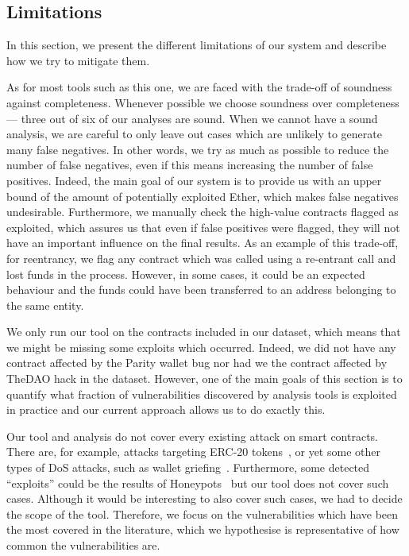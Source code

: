 \subsection{Limitations}
\label{sec:5a:limitations}
In this section, we present the different limitations of our system and describe how we try to mitigate them.

 As for most tools such as this one, we are faced with the trade-off of soundness against completeness. Whenever possible we choose soundness over completeness --- three out of six of our analyses are sound. When we cannot have a sound analysis, we are careful to only leave out cases which are unlikely to generate many false negatives. In other words, we try as much as possible to reduce the number of false negatives, even if this means increasing the number of false positives.
Indeed, the main goal of our system is to provide us with an upper bound of the amount of potentially exploited Ether, which makes false negatives undesirable.
Furthermore, we manually check the high-value contracts flagged as exploited, which assures us that even if false positives were flagged, they will not have an important influence on the final results.
As an example of this trade-off, for reentrancy, we flag any contract which was called using a re-entrant call and lost funds in the process. However, in some cases, it could be an expected behaviour and the funds could have been transferred to an address belonging to the same entity.

 We only run our tool on the contracts included in our dataset, which means that we might be missing some exploits which occurred. Indeed, we did not have any contract affected by the Parity wallet bug nor had we the contract affected by TheDAO hack in the dataset.
However, one of the main goals of this section is to quantify what fraction of vulnerabilities discovered by analysis tools is exploited in practice and our current approach allows us to do exactly this.

 Our tool and analysis do not cover every existing attack on smart contracts. There are, for example, attacks targeting ERC-20 tokens~\cite{8802438}, or yet some other types of DoS attacks, such as wallet griefing~\cite{Grech2018}.
Furthermore, some detected ``exploits'' could be the results of Honeypots~\cite{236240} but our tool does not cover such cases.
Although it would be interesting to also cover such cases, we had to decide the scope of the tool. Therefore, we focus on the vulnerabilities which have been the most covered in the literature, which we hypothesise is representative of how common the vulnerabilities are.
